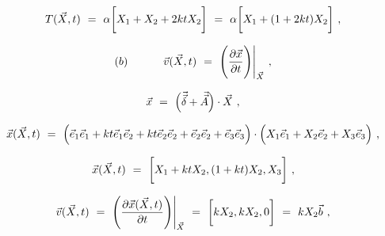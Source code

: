 \documentclass{article}
\begin{document}
\begin{equation} \label{eb-eq-1-11}
T( \vec{X} , t ) \hspace{0.125cm} = \hspace{0.125cm} \alpha \bigg[ X_1 + X_2 + 2 k t  X_2 \bigg] \hspace{0.125cm} = \hspace{0.125cm} \alpha \bigg[ X_1 + (1 + 2 k t) X_2 \bigg] \hspace{0.125cm} ,
\end{equation}

\begin{equation} \label{eb-eq-1-12}
(b) \hspace{1.125cm} \vec{v}( \vec{X} , t ) \hspace{0.125cm} = \hspace{0.125cm} \Bigg( \frac{ \partial{\vec{x}}}{\partial{t}} \Bigg) \Bigg|_{\vec{X}} \hspace{0.125cm} , 
\end{equation}

\begin{equation} \label{eb-eq-1-13}
\vec{x} \hspace{0.125cm} = \hspace{0.125cm} \Big( \vec{\vec{\delta}} + \vec{\vec{A}} \Big) \cdot \vec{X} \hspace{0.125cm} , 
\end{equation}

\begin{equation} \label{eb-eq-1-14}
\vec{x}( \vec{X} , t ) \hspace{0.125cm} = \hspace{0.125cm} \Big( \vec{e}_1 \vec{e}_1 + k t \vec{e}_1 \vec{e}_2 + k t \vec{e}_2 \vec{e}_2 + \vec{e}_2 \vec{e}_2 + \vec{e}_3 \vec{e}_3 \Big) \cdot \Big( X_1 \vec{e}_1 + X_2 \vec{e}_2  + X_3 \vec{e}_3 \Big) \hspace{0.125cm} , 
\end{equation}

\begin{equation} \label{eb-eq-1-15}
\vec{x}( \vec{X} , t ) \hspace{0.125cm} = \hspace{0.125cm} \bigg[ X_1 + k t X_2 , ( 1 + kt ) X_2 , X_3 \bigg] \hspace{0.125cm} , 
\end{equation}

\begin{equation} \label{eb-eq-1-16}
\vec{v}( \vec{X} , t ) \hspace{0.125cm} = \hspace{0.125cm} \Bigg( \frac{ \partial{\vec{x}( \vec{X} , t )}}{\partial{t}} \Bigg) \Bigg|_{\vec{X}} \hspace{0.125cm} = \hspace{0.125cm} \bigg[ k X_2 , k X_2 , 0 \bigg] \hspace{0.125cm} = \hspace{0.125cm} k X_2 \vec{b} \hspace{0.125cm} , 
\end{equation}
\end{document}
